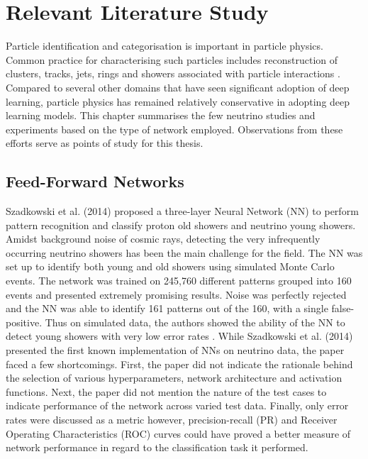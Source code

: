 \chapter{Relevant Literature Study} 
\label{sec:literature}

\ifpdf
    \graphicspath{{2_literature/figures/PNG/}{2_lirterature/figures/}}
\else
    \graphicspath{{2_literature/figures/EPS/}{2_literature/figures/}}
\fi

Particle identification and categorisation is important in particle physics. Common practice for characterising such particles includes reconstruction of clusters, tracks, jets, rings and showers associated with particle interactions \cite{aurisano2016convolutional}. Compared to several other domains that have seen significant adoption of deep learning, particle physics has remained relatively conservative in adopting deep learning models. This chapter summarises the few neutrino studies and experiments based on the type of network employed. Observations from these efforts serve as points of study for this thesis. 

\section{Feed-Forward Networks}
Szadkowski et al. (2014) proposed a three-layer Neural Network (NN) to perform pattern recognition and classify proton old showers and neutrino young showers. Amidst background noise of cosmic rays, detecting the very infrequently occurring neutrino showers has been the main challenge for the field. The NN was set up to identify both young and old showers using simulated Monte Carlo events. The network was trained on 245,760 different patterns grouped into 160 events and presented extremely promising results. Noise was perfectly rejected and the NN was able to identify 161 patterns out of the 160, with a single false-positive. Thus on simulated data, the authors showed the ability of the NN to detect young showers with very low error rates \cite{szadkowski2015artificial}. While Szadkowski et al. (2014) presented the first known implementation of NNs on neutrino data, the paper faced a few shortcomings. First, the paper did not indicate the rationale behind the  selection of various hyperparameters, network architecture and activation functions. Next, the paper did not mention the nature of the test cases to indicate performance of the network across varied test data.  Finally, only error rates were discussed as a metric however, precision-recall (PR) and Receiver Operating Characteristics (ROC) curves could have proved a better measure of network performance in regard to the classification task it performed. 

